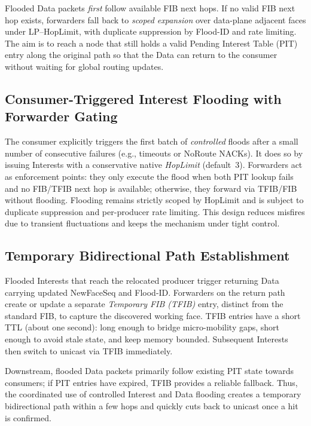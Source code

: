 \documentclass[10pt,conference]{IEEEtran}
\begin{document}
Flooded Data packets \emph{first} follow available FIB next hops. If no valid FIB next hop exists, forwarders fall back to \emph{scoped expansion} over data-plane adjacent faces under LP--HopLimit, with duplicate suppression by Flood-ID and rate limiting. The aim is to reach a node that still holds a valid Pending Interest Table (PIT) entry along the original path so that the Data can return to the consumer without waiting for global routing updates.

\subsection{Consumer-Triggered Interest Flooding with Forwarder Gating}
\label{sec:solution:interest-flooding}

The consumer explicitly triggers the first batch of \emph{controlled} floods after a small number of consecutive failures (e.g., timeouts or NoRoute NACKs). It does so by issuing Interests with a conservative native \emph{HopLimit} (default~3). Forwarders act as enforcement points: they only execute the flood when both PIT lookup fails and no FIB/TFIB next hop is available; otherwise, they forward via TFIB/FIB without flooding. Flooding remains strictly scoped by HopLimit and is subject to duplicate suppression and per-producer rate limiting. This design reduces misfires due to transient fluctuations and keeps the mechanism under tight control.

\subsection{Temporary Bidirectional Path Establishment}
\label{sec:solution:bidir}

Flooded Interests that reach the relocated producer trigger returning Data carrying updated NewFaceSeq and Flood-ID. Forwarders on the return path create or update a separate \emph{Temporary FIB (TFIB)} entry, distinct from the standard FIB, to capture the discovered working face. TFIB entries have a short TTL (about one second): long enough to bridge micro-mobility gaps, short enough to avoid stale state, and keep memory bounded. Subsequent Interests then switch to unicast via TFIB immediately.

Downstream, flooded Data packets primarily follow existing PIT state towards consumers; if PIT entries have expired, TFIB provides a reliable fallback. Thus, the coordinated use of controlled Interest and Data flooding creates a temporary bidirectional path within a few hops and quickly cuts back to unicast once a hit is confirmed.
\end{document}
